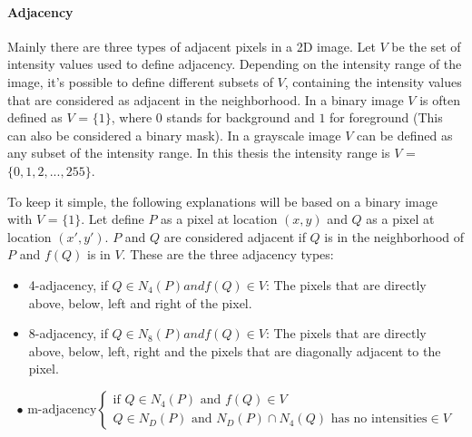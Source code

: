 \paragraph*{Adjacency} Mainly there are three types of adjacent pixels in a 2D image. Let $V$ be the set of intensity values used to define adjacency. Depending on the intensity range of the image, it's possible to define different subsets of $V$, containing the intensity values that are considered as adjacent in the neighborhood. In a binary image $V$ is often defined as $V$ = $\{1\}$, where $0$ stands for background and $1$ for foreground (This can also be considered a binary mask). In a grayscale image $V$ can be defined as any subset of the intensity range. In this thesis the intensity range is $V$ = $\{0,1,2,...,255\}$.

To keep it simple, the following explanations will be based on a binary image with $V$ = $\{1\}$. Let define $P$ as a pixel at location $(x,y)$ and $Q$ as a pixel at location $(x',y')$. $P$ and $Q$ are considered adjacent if $Q$ is in the neighborhood of $P$ and $f(Q)$ is in $V$. These are the three adjacency types:

\begin{itemize}
    \item 4-adjacency, if $Q \in N_4(P) and f(Q) \in  V$: The pixels that are directly above, below, left and right of the pixel.
    \item 8-adjacency, if $Q \in N_8(P) and f(Q) \in  V$: The pixels that are directly above, below, left, right and the pixels that are diagonally adjacent to the pixel.
\end{itemize}
\begin{equation*}
    \bullet \text{ m-adjacency} \begin{cases}
   \text{if } Q \in N_4(P) \text{ and } f(Q) \in  V \\
    Q \in N_D(P) \text{ and } N_D(P)  \cap N_4(Q) \text{ has no intensities} \in  V
    \end{cases}
    \end{equation*}


